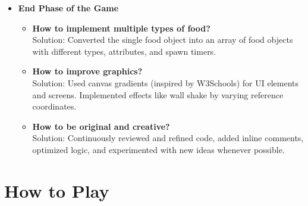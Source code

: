 \begin{itemize}
\begin{itemize}
\end{itemize}

\item \textbf{End Phase of the Game}

\begin{itemize}

\item \textbf{How to implement multiple types of food?} \\
Solution: Converted the single food object into an array of food objects with different types, attributes, and spawn timers.

\item \textbf{How to improve graphics?} \\
Solution: Used canvas gradients (inspired by W3Schools) for UI elements and screens. Implemented effects like wall shake by varying reference coordinates.

\item \textbf{How to be original and creative?} \\
Solution: Continuously reviewed and refined code, added inline comments, optimized logic, and experimented with new ideas whenever possible.
 
\end{itemize}
\end{itemize}
\section{How to Play}

